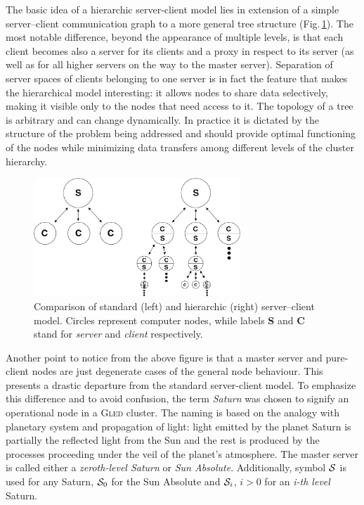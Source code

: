 \documentclass[a4paper,11pt]{article}
\def\gled{\textsc{Gled}\xspace}
\begin{document}
The basic idea of a hierarchic server-client model lies in extension
of a simple server--client communication graph to a more general tree
structure (Fig.\,\ref{fig:hscm}). The most notable difference, beyond
the appearance of multiple levels, is that each client becomes also a
server for its clients and a proxy in respect to its server (as well
as for all higher servers on the way to the master server). Separation
of server spaces of clients belonging to one server is in fact the
feature that makes the hierarchical model interesting: it allows nodes
to share data selectively, making it visible only to the nodes that
need access to it. The topology of a tree is arbitrary and can change
dynamically. In practice it is dictated by the structure of the
problem being addressed and should provide optimal functioning of the
nodes while minimizing data transfers among different levels of the
cluster hierarchy.

\begin{figure}
\centering
\includegraphics[height=4.45cm]{figs/hscm}
\caption{Comparison of standard (left) and hierarchic (right)
  server--client model. Circles represent computer nodes, while
  labels \textbf{S} and \textbf{C} stand for \emph{server} and
  \emph{client} respectively.}
\label{fig:hscm}
\end{figure}

Another point to notice from the above figure is that a master server
and pure-client nodes are just degenerate cases of the general node
behaviour. This presents a drastic departure from the standard
server-client model. To emphasize this difference and to avoid
confusion, the term \emph{Saturn} was chosen to signify an operational
node in a \gled cluster. The naming is based on the analogy with
planetary system and propagation of light: light emitted by the planet
Saturn is partially the reflected light from the Sun and the rest is
produced by the processes proceeding under the veil of the planet's
atmosphere. The master server is called either a \emph{zeroth-level
 Saturn} or \emph{Sun Absolute}. Additionally, symbol ${\cal S}$ is
used for any Saturn, ${\cal S}_0$ for the Sun Absolute and ${\cal
 S}_i$, $i > 0$ for an \emph{i-th level} Saturn.
\end{document}
